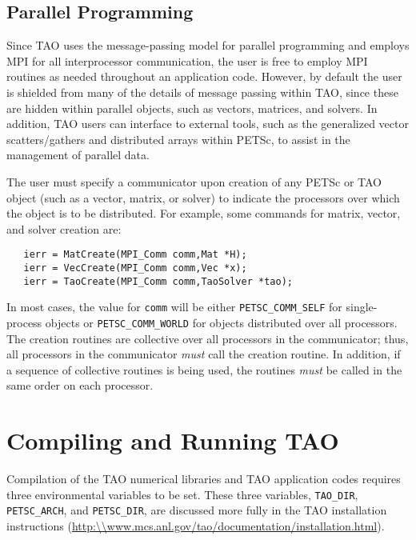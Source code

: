 \subsection*{Parallel Programming}

Since TAO uses the message-passing model for parallel programming and
employs MPI for all interprocessor communication, the user is free to
employ MPI routines as needed throughout an application code.
However, by default the user is shielded from many of the details of
message passing within TAO, since these are hidden within parallel
objects, such as vectors, matrices, and solvers.  In addition, TAO
users can interface to external tools, such as the generalized vector
scatters/gathers and distributed arrays within PETSc, to assist in the
management of parallel data.

The user must specify a communicator
upon creation of any PETSc or TAO object (such as a vector, matrix, or 
solver)
to indicate the processors over which the object is to be distributed. 
For example, some commands for matrix, vector, and solver creation
are:
\begin{verbatim}
   ierr = MatCreate(MPI_Comm comm,Mat *H);
   ierr = VecCreate(MPI_Comm comm,Vec *x);
   ierr = TaoCreate(MPI_Comm comm,TaoSolver *tao); 
\end{verbatim}
\noindent
In most cases, the value for \texttt{comm} will be either 
\texttt{PETSC\_COMM\_SELF} for single-process objects or 
\texttt{PETSC\_COMM\_WORLD} for objects distributed over all processors.
The creation routines are collective over all processors in the
communicator; thus, all processors in the communicator {\em must} call
the creation routine.  In addition, if a sequence of collective
routines is being used, the routines {\em must} be called in the same
order on each processor.

\section{Compiling and Running TAO}
\label{sec:running}

Compilation of the TAO numerical libraries and TAO application codes
requires three environmental variables to be set.  These three
variables, \texttt{TAO\_DIR}, \texttt{PETSC\_ARCH}, and \texttt{PETSC\_DIR},
are discussed more fully in the TAO installation instructions (\url{http:\\www.mcs.anl.gov/tao/documentation/installation.html}).

